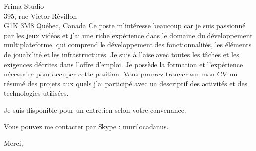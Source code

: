 \documentclass[11pt]{letter} %
\begin{document}
\begin{letter}{%
Frima Studio \\
395, rue Victor-Révillon \\
G1K 3M8 Québec, Canada}
Ce poste m'intéresse beaucoup car je suis passionné par les jeux vidéos et j'ai une riche expérience dans le domaine du développement multiplateforme, qui comprend le développement des fonctionnalités, les éléments de jouabilité et les infrastructures. Je suis à l'aise avec toutes les tâches et les exigences décrites dans l'offre d'emploi. Je possède la formation et l'expérience nécessaire pour occuper cette position. Vous pourrez trouver sur mon CV un résumé des projets aux quels j'ai participé avec un descriptif des activités et des technologies utilisées.

Je suis disponible pour un entretien selon votre convenance.

Vous pouvez me contacter par Skype : murilocadanus.

\closing{Merci, }


\end{letter}
\end{document}
